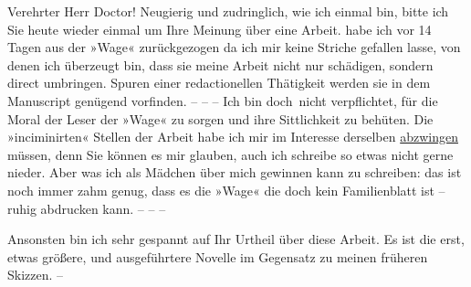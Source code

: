\pstart{}Verehrter Herr Doctor!\pend\vspace{0.5em}
\pstart
           Neugierig und zudringlich, wie ich einmal bin, bitte ich Sie heute
               wieder einmal um Ihre Meinung über eine Arbeit. \label{K_L03718-1v}\label{K_L03718-1} habe ich vor 14
               Tagen aus der »Wage« zurückgezogen da ich mir
               keine Striche gefallen lasse, von denen ich überzeugt bin, dass {\pb}sie
               meine Arbeit nicht nur schädigen, sondern direct umbringen. Spuren einer
               redactionellen Thätigkeit werden sie in dem Manuscript genügend vorfinden. – – – Ich bin doch nicht
               verpflichtet, für die Moral der Leser der »Wage«
               zu sorgen und ihre Sittlichkeit zu behüten. Die »inciminirten« Stellen der Arbeit habe ich mir im
               Interesse derselben \uline{abzwingen} müssen, denn Sie können
               es mir glauben, auch ich schreibe so etwas nicht gerne nieder. Aber was ich als
               Mädchen über mich {\pb}gewinnen kann zu schreiben: das ist noch immer zahm
               genug, dass es die »Wage« die doch kein
               Familienblatt ist – ruhig abdrucken kann. – – –\pend
           
\pstart
           Ansonsten bin ich sehr gespannt auf Ihr Urtheil über diese Arbeit. Es ist die erst, etwas größere,
               und ausgeführtere Novelle im
               Gegensatz zu meinen früheren Skizzen. –\pend
           
